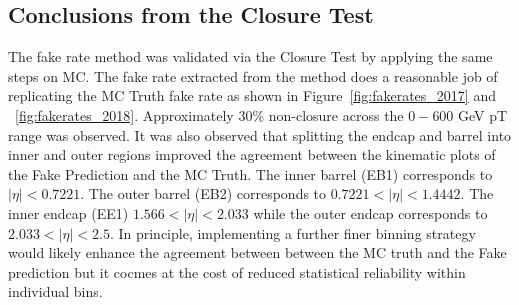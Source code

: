 \subsection{Conclusions from the Closure Test}

The fake rate method was validated via the Closure Test by applying the same steps on MC. The fake rate extracted from the method does a reasonable job of replicating the MC Truth fake rate as shown in Figure~\ref{fig:fakerates_2017} and ~\ref{fig:fakerates_2018}. Approximately 30\% non-closure across the $0-600$ GeV pT range was observed. It was also observed that splitting the endcap and barrel into inner and outer regions improved the agreement between the kinematic plots of the Fake Prediction and the MC Truth. The inner barrel (EB1) corresponds to $|\eta| <  0.7221$. The outer barrel (EB2) corresponds to $0.7221 < |\eta| < 1.4442$. The inner endcap (EE1) $1.566 < |\eta| < 2.033$ while the outer endcap corresponds to $2.033 < \lvert \eta \rvert< 2.5$. In principle, implementing a further finer binning strategy would likely enhance the agreement between between the MC truth and the Fake prediction but it cocmes at the cost of reduced statistical reliability within individual bins.






